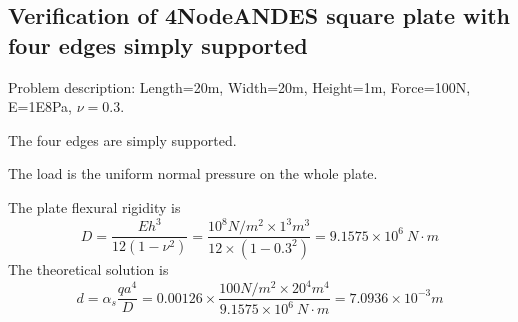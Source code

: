 \documentclass[fleqn,11pt]{article}
\begin{document}











\newpage
\subsection{Verification of 4NodeANDES square plate with four edges simply supported}

Problem description: Length=20m, Width=20m, Height=1m, Force=100N, E=1E8Pa, $\nu=0.3$. 

The four edges are simply supported. 

The load is the uniform normal pressure on the whole plate. 

The plate flexural rigidity is 
\begin{equation}
  D=\frac{Eh^3}{12(1-\nu^2)}=\frac{10^8 N/m^2 \times 1^3 m^3 }{12 \times (1-0.3^2) }= 9.1575 \times 10^6 \ N\cdot m
\end{equation}
The theoretical solution is 
\begin{equation}
  d=\alpha_s \frac{q a^4}{D}=0.00126\times \frac{100 N/m^2 \times 20^4 m^4}{9.1575 \times 10^6 \ N\cdot m}=7.0936\times 10^{-3} m
\end{equation}
\end{document}
